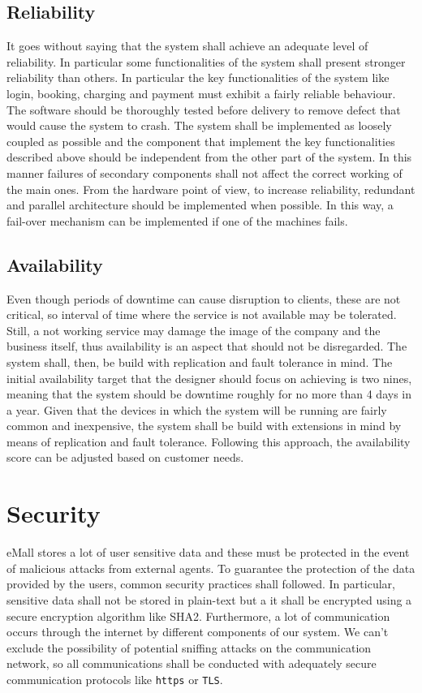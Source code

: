 \subsection{Reliability}
It goes without saying that the system shall achieve an adequate level of reliability. In particular some functionalities of the system shall present stronger reliability than others. In particular the key functionalities of the system like login, booking, charging and payment must exhibit a fairly reliable behaviour. The software should be thoroughly tested before delivery to remove defect that would cause the system to crash. The system shall be implemented as loosely coupled as possible and the component that implement the key functionalities described above should be independent from the other part of the system. In this manner failures of secondary components shall not affect the correct working of the main ones. From the hardware point of view, to increase reliability, redundant and parallel architecture should be implemented when possible. In this way, a fail-over mechanism can be implemented if one of the machines fails.

\subsection{Availability}
Even though periods of downtime can cause disruption to clients, these are not critical, so interval of time where the service is not available may be tolerated. Still, a not working service may damage the image of the company and the business itself, thus availability is an aspect that should not be disregarded. The system shall, then, be build with replication and fault tolerance in mind. The initial availability target that the designer  should focus on achieving is two nines, meaning that the system should be downtime roughly for no more than 4 days in a year. Given that the devices in which the system will be running are fairly common and inexpensive, the system shall be build with extensions in mind by means of replication and fault tolerance. Following this approach, the availability score can be adjusted based on customer needs.

\section{Security}
eMall stores a lot of user sensitive data and these must be protected in the event of malicious attacks from external agents. To guarantee the protection of the data provided by the users, common security practices shall followed. In particular, sensitive data shall not be stored in plain-text but a it shall be encrypted using a secure encryption algorithm like SHA2. Furthermore, a lot of communication occurs through the internet  by different components of our system. We can't exclude the possibility of potential sniffing attacks on the communication network, so all communications shall be conducted with adequately secure communication protocols like \verb|https| or \verb|TLS|.

